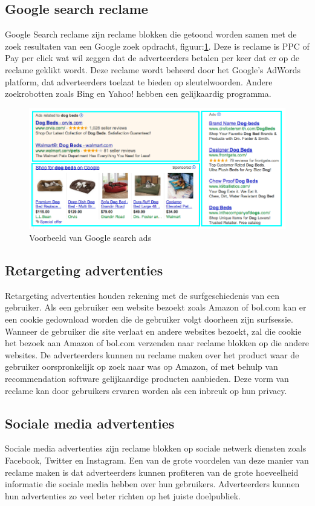\documentclass[pdftex,a4paper,12pt,twoside]{report}
\begin{document}
\subsection{Google search reclame }
\label{sec Google search reclame }
Google Search reclame zijn reclame blokken die getoond worden samen met de zoek resultaten van een Google zoek opdracht, figuur:\ref{fig: Google-Search-ad}. Deze is reclame is PPC of Pay per click wat wil zeggen dat de adverteerders betalen per keer dat er op de reclame geklikt wordt. Deze reclame wordt beheerd door het Google’s AdWords platform, dat adverteerders toelaat te bieden op sleutelwoorden. Andere zoekrobotten zoals Bing en Yahoo! hebben een gelijkaardig programma.
\begin{figure}[h!]
\centering
\includegraphics[width=12cm]{img/example-of-google-ads}
\caption{Voorbeeld van Google search ads}
\label{fig: Google-Search-ad}
\end{figure}
\subsection{Retargeting advertenties }
\label{sec Retargeting advertenties }
Retargeting advertenties houden rekening met de surfgeschiedenis van een gebruiker. Als een gebruiker een website bezoekt zoals Amazon of bol.com kan er een cookie gedownload worden die de gebruiker volgt doorheen zijn surfsessie. Wanneer de gebruiker die site verlaat en andere websites bezoekt, zal die cookie het bezoek aan Amazon of bol.com verzenden naar reclame blokken op die andere websites. De adverteerders kunnen nu reclame maken over het product waar de gebruiker oorspronkelijk op zoek naar was op Amazon, of met behulp van recommendation software gelijkaardige producten aanbieden. Deze vorm van reclame kan door gebruikers ervaren worden als een inbreuk op hun privacy.
\subsection{Sociale media advertenties }
\label{sec Sociale media advertenties }
Sociale media advertenties zijn reclame blokken op sociale netwerk diensten zoals Facebook, Twitter en Instagram. Een van de grote voordelen van deze manier van reclame maken is dat adverteerders kunnen profiteren van de grote hoeveelheid informatie die sociale media hebben over hun gebruikers. Adverteerders kunnen hun advertenties zo veel beter richten op het juiste doelpubliek.
\end{document}

